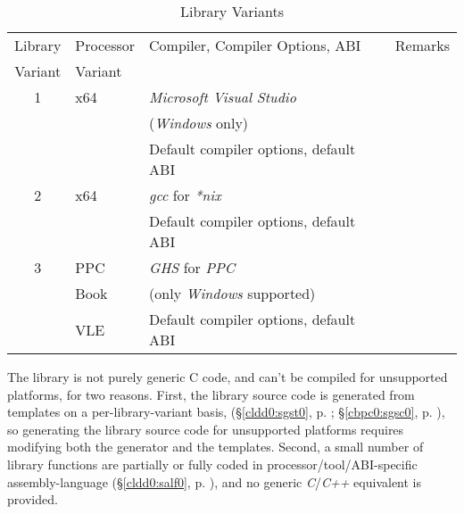 \begin{table}
\caption{\emph{\productbasenameshort{}} Library Variants}
\label{tbl:cldd0:sscc0:01}
\begin{center}
\begin{tabular}{|c|l|l|l|}
\hline
Library & Processor & Compiler, Compiler Options, ABI                         & Remarks                               \\
Variant & Variant   &                                                         &                                       \\
\hline
\hline
   1    & x64       & \emph{Microsoft Visual Studio}                          &                                       \\
        &           & (\index{Windows@\emph{Windows}}\emph{Windows} only)     &                                       \\
        &           & Default compiler options, default ABI                   &                                       \\
\hline
   2    & x64       & \emph{gcc} for \index{----nix@\emph{*nix}}\emph{*nix}   &                                       \\
        &           & Default compiler options, default ABI                   &                                       \\
\hline
   3    & PPC       & \emph{GHS} for \emph{PPC}                               &                                       \\
        & Book      & (only \emph{Windows} supported)                         &                                       \\
        & VLE       & Default compiler options, default ABI                   &                                       \\
\hline
\end{tabular}
\end{center}
\end{table}

The library is not purely generic C code, and can't be 
compiled for unsupported platforms, for two reasons.  First, 
the library source code is generated from templates on a 
per-library-variant basis, (\S{}\ref{cldd0:sgst0}, p.  
\pageref{cldd0:sgst0}; \S{}\ref{cbpc0:sgsc0}, p.  
\pageref{cbpc0:sgsc0}), so generating the library source 
code for unsupported platforms requires modifying both the 
generator and the templates.  Second, a small number of 
library functions are partially or fully coded in 
processor/\-tool/\-ABI-specific assembly-language 
(\S{}\ref{cldd0:salf0}, p.  \pageref{cldd0:salf0}), and no 
generic \emph{C}/\emph{C++} equivalent is provided.


